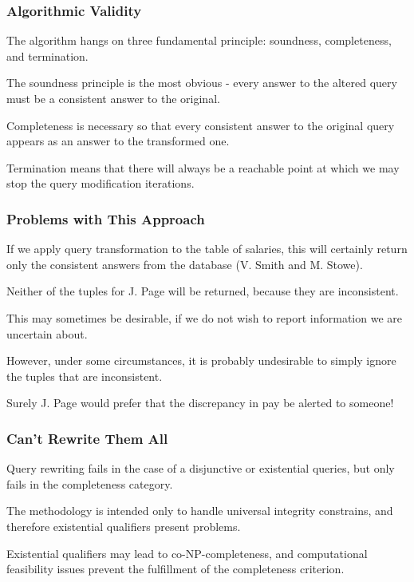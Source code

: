\begin{frame}
\frametitle{Algorithmic Validity}

The algorithm hangs on three fundamental principle: soundness, completeness, and termination.

The soundness principle is the most obvious - every answer to the altered query must be a consistent answer to the original.

Completeness is necessary so that every consistent answer to the original query appears as an answer to the transformed one. 

Termination means that there will always be a reachable point at which we may stop the query modification iterations.

\end{frame}



\begin{frame}
\frametitle{Problems with This Approach}

If we apply query transformation to the table of salaries, this will certainly return only the consistent answers from the database (V. Smith and M. Stowe). 

Neither of the tuples for J. Page will be returned, because they are inconsistent. 

This may sometimes be desirable, if we do not wish to report information we are uncertain about. 

However, under some circumstances, it is probably undesirable to simply ignore the tuples that are inconsistent. 

Surely J. Page would prefer that the discrepancy in pay be alerted to someone!


\end{frame}

\begin{frame}
\frametitle{Can't Rewrite Them All}

Query rewriting fails in the case of a disjunctive or existential queries, but only fails in the completeness category. 

The methodology is intended only to handle universal integrity constrains, and therefore existential qualifiers present problems. 

Existential qualifiers may lead to co-NP-completeness, and computational feasibility issues prevent the fulfillment of the completeness criterion. 


\end{frame}




















